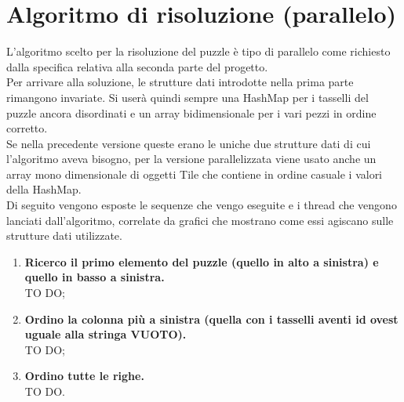 % 
%
%

\section{Algoritmo di risoluzione (parallelo)}
L'algoritmo scelto per la risoluzione del puzzle è tipo di parallelo come richiesto dalla specifica relativa alla seconda parte del progetto. \\
Per arrivare alla soluzione, le strutture dati introdotte nella prima parte rimangono invariate. Si userà quindi sempre una HashMap per i tasselli del puzzle ancora disordinati e un array bidimensionale per i vari pezzi in ordine corretto. \\
Se nella precedente versione queste erano le uniche due strutture dati di cui l'algoritmo aveva bisogno, per la versione parallelizzata viene usato anche un array mono dimensionale di oggetti Tile che contiene in ordine casuale i valori della HashMap. \\
Di seguito vengono esposte le sequenze che vengo eseguite e i thread che vengono lanciati dall'algoritmo, correlate da grafici che mostrano come essi agiscano sulle strutture dati utilizzate.

	\begin{enumerate}
		\item \textbf{Ricerco il primo elemento del puzzle (quello in alto a sinistra) e quello in basso a sinistra.} \\
		TO DO;
		\item \textbf{Ordino la colonna più a sinistra (quella con i tasselli aventi id ovest uguale alla stringa VUOTO).} \\
		TO DO;
		\item \textbf{Ordino tutte le righe.} \\
		TO DO.
	\end{enumerate}




